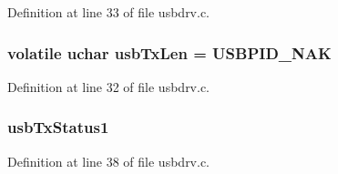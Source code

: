 Definition at line 33 of file usbdrv.\-c.

\hypertarget{mhvlib-_vusb-_console_2vusb_2usbdrv_8c_a6d1c6f67a95541d4f45d26dd80e07693}{
\subsubsection[{usb\-Tx\-Len}]{\setlength{\rightskip}{0pt plus 5cm}volatile {\bf uchar} usb\-Tx\-Len = {\bf U\-S\-B\-P\-I\-D\-\_\-\-N\-A\-K}}}\label{mhvlib-_vusb-_console_2vusb_2usbdrv_8c_a6d1c6f67a95541d4f45d26dd80e07693}


Definition at line 32 of file usbdrv.\-c.

\hypertarget{mhvlib-_vusb-_console_2vusb_2usbdrv_8c_a8787d5ad73afd0d305818dfbdce2bc85}{
\subsubsection[{usb\-Tx\-Status1}]{ usb\-Tx\-Status1}}\label{mhvlib-_vusb-_console_2vusb_2usbdrv_8c_a8787d5ad73afd0d305818dfbdce2bc85}


Definition at line 38 of file usbdrv.\-c.

